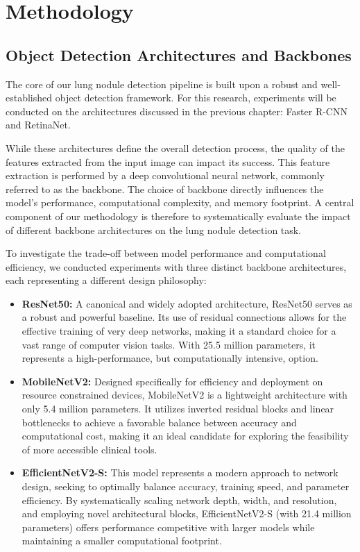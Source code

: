 \chapter{Methodology}
\section{Object Detection Architectures and Backbones}
\label{sec:arch_and_backbones}
The core of our lung nodule detection pipeline is built upon a robust and well-established object detection framework. For this research, experiments will be conducted on the architectures discussed in the previous chapter: Faster R-CNN and RetinaNet.

While these architectures define the overall detection process, the quality of the features extracted from the input image can impact its success. This feature extraction is performed by a deep convolutional neural network, commonly referred to as the backbone. The choice of backbone directly influences the model's performance, computational complexity, and memory footprint. A central component of our methodology is therefore to systematically evaluate the impact of different backbone architectures on the lung nodule detection task.

To investigate the trade-off between model performance and computational efficiency, we conducted experiments with three distinct backbone architectures, each representing a different design philosophy:

\begin{itemize}
    \item \textbf{ResNet50:} A canonical and widely adopted architecture, ResNet50 serves as a robust and powerful baseline. Its use of residual connections allows for the effective training of very deep networks, making it a standard choice for a vast range of computer vision tasks. With 25.5 million parameters, it represents a high-performance, but computationally intensive, option.

    \item \textbf{MobileNetV2:} Designed specifically for efficiency and deployment on resource constrained devices, MobileNetV2 is a lightweight architecture with only 5.4 million parameters. It utilizes inverted residual blocks and linear bottlenecks to achieve a favorable balance between accuracy and computational cost, making it an ideal candidate for exploring the feasibility of more accessible clinical tools.

    \item \textbf{EfficientNetV2-S:} This model represents a modern approach to network design, seeking to optimally balance accuracy, training speed, and parameter efficiency. By systematically scaling network depth, width, and resolution, and employing novel architectural blocks, EfficientNetV2-S (with 21.4 million parameters) offers performance competitive with larger models while maintaining a smaller computational footprint.
\end{itemize}

